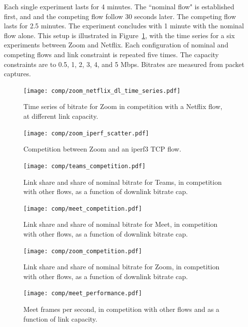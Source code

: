 Each single experiment lasts for 4 minutes.
The ``nominal flow" is established first, and
  and the competing flow follow 30 seconds later.
The competing flow lasts for 2.5 minutes.
The experiment concludes with 1 minute
  with the nominal flow alone.
This setup is illustrated in Figure~\ref{fig:ts_zoom_netflix},
  with the time series for a six experiments between Zoom and Netflix.
Each configuration of nominal and competing flows and link constraint
  is repeated five times.
The capacity constraints are to 0.5, 1, 2, 3, 4, and 5 Mbps.
Bitrates are measured from packet captures.
  
\begin{figure}[t]
    \texttt{[image: comp/zoom\_netflix\_dl\_time\_series.pdf]}
    \caption{Time series of bitrate for Zoom in competition with a Netflix flow, at different link capacity. }
	\label{fig:ts_zoom_netflix}
\end{figure}

\begin{figure}[t]
    \texttt{[image: comp/zoom\_iperf\_scatter.pdf]}
    \caption{Competition between Zoom and an iperf3 TCP flow. }
	\label{fig:comp_zoom_iperf}
\end{figure}

\begin{figure}[t]
    \texttt{[image: comp/teams\_competition.pdf]}
    \caption{Link share and share of nominal bitrate for Teams, in competition with other flows, as a function of downlink bitrate cap. }
	\label{fig:teams_comp_bitrates}
\end{figure}

\begin{figure}[t]
    \texttt{[image: comp/meet\_competition.pdf]}
    \caption{Link share and share of nominal bitrate for Meet, in competition with other flows, as a function of downlink bitrate cap.}
	\label{fig:meet_comp_bitrates}
\end{figure}

\begin{figure}[t]
    \texttt{[image: comp/zoom\_competition.pdf]}
    \caption{Link share and share of nominal bitrate for Zoom, in competition with other flows, as a function of downlink bitrate cap.}
	\label{fig:zoom_comp_bitrates}
\end{figure}

\begin{figure}[t]
    \texttt{[image: comp/meet\_performance.pdf]}
    \caption{Meet frames per second, in competition with other flows and as a function of link capacity.}
	\label{fig:meet_comp_performance}
\end{figure}



